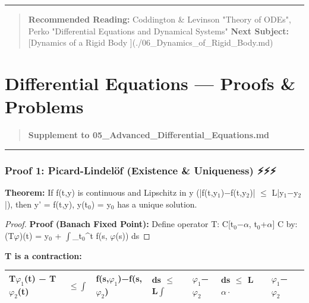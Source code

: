 \documentclass[12pt,a4paper,openany]{book}
\begin{document}
{{\bigskip\noindent\rule{\textwidth}{0.4pt}\bigskip

\begin{quote}
\textbf{ Recommended Reading:} Coddington & Levinson "Theory of ODEs", Perko "Differential Equations and Dynamical Systems"
\textbf{Next Subject:} [Dynamics of a Rigid Body ](./06_Dynamics_of_Rigid_Body.md)
\end{quote}

\newpage

\chapter{Differential Equations --- Proofs \& Problems}


\begin{quote}
\textbf{Supplement to 05_Advanced_Differential_Equations.md}
\end{quote}

\bigskip\noindent\rule{\textwidth}{0.4pt}\bigskip


\subsection{Proof 1: Picard-Lindelöf (Existence & Uniqueness) ⚡⚡⚡}

\begin{tcolorbox}[colback=lightblue,colframe=thmblue,title=\textbf{Theorem},breakable,boxrule=1.5pt]
\textbf{Theorem:} If f(t,y) is continuous and Lipschitz in y (|f(t,y$_1$)−f(t,y$_2$)| $\leq$ L|y$_1$−y$_2$|), then y' = f(t,y), y(t$_0$) = y$_0$ has a unique solution.
\end{tcolorbox}

\begin{proof}
\textbf{Proof (Banach Fixed Point):}
Define operator T: C[t$_0$−$\alpha$, t$_0$+$\alpha$]  C by:
(T$\varphi$)(t) = y$_0$ + $\int$_{t$_0$}^{t} f(s, $\varphi$(s)) ds
\end{proof}

\textbf{T is a contraction:} 
\begin{center}
\begin{tabular}{|l|l|l|l|l|l|l|l|l|}
\hline
\textbf{T$\varphi_1$(t) − T$\varphi_2$(t)} & \textbf{$\leq\int$} & \textbf{f(s,$\varphi_1$)−f(s,$\varphi_2$)} & \textbf{ds $\leq$ L$\int$} & \textbf{$\varphi_1$−$\varphi_2$} & \textbf{ds $\leq$ L$\alpha\cdot$} & \textbf{} & \textbf{$\varphi_1$−$\varphi_2$} & \textbf{} \\
\hline
\end{tabular}
\end{center}

}}
\end{document}
